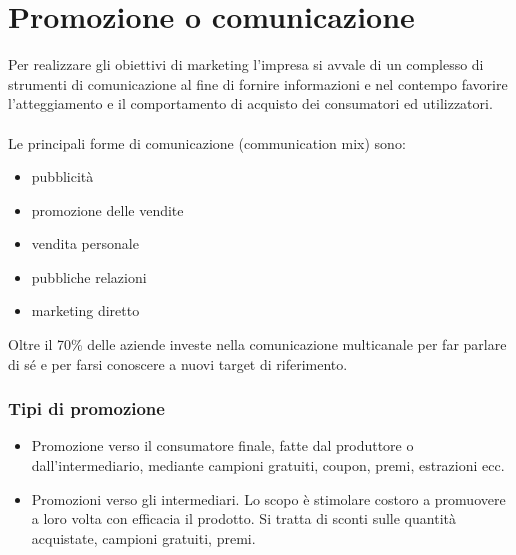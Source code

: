 \section{Promozione o comunicazione}
Per realizzare gli obiettivi di marketing l’impresa si avvale di un complesso di strumenti di comunicazione al fine di fornire informazioni e nel contempo favorire l’atteggiamento e il comportamento di acquisto dei consumatori ed utilizzatori.
\\
\\
Le principali forme di comunicazione (communication mix) sono:
\begin{itemize}
	\item pubblicità
	\item promozione delle vendite
	\item vendita personale
	\item pubbliche relazioni
	\item marketing diretto	
\end{itemize}

Oltre il 70\% delle aziende investe nella comunicazione multicanale per far parlare di sé e per farsi conoscere a nuovi target di riferimento.


\subsubsection{Tipi di promozione}
\begin{itemize}
	\item Promozione verso il consumatore finale, fatte dal produttore o dall'intermediario, mediante campioni gratuiti, coupon, premi, estrazioni ecc.
	\item Promozioni verso gli intermediari. Lo scopo è stimolare costoro	a promuovere a loro volta con efficacia il prodotto. Si tratta di sconti sulle quantità acquistate, campioni gratuiti, premi.
\end{itemize}



